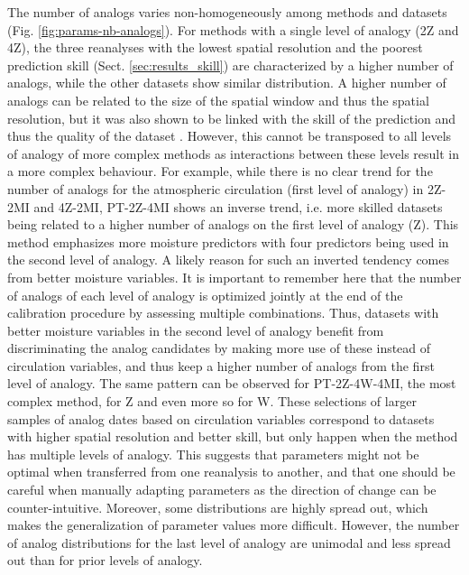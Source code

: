 \documentclass[alpha-refs]{wiley-article}
\begin{document}
The number of analogs varies non-homogeneously among methods and datasets (Fig. \ref{fig:params-nb-analogs}). For methods with a single level of analogy (2Z and 4Z), the three reanalyses with the lowest spatial resolution and the poorest prediction skill (Sect. \ref{sec:results_skill}) are characterized by a higher number of analogs, while the other datasets show similar distribution. A higher number of analogs can be related to the size of the spatial window and thus the spatial resolution, but it was also shown to be linked with the skill of the prediction and thus the quality of the dataset \citep{Horton2017b}. However, this cannot be transposed to all levels of analogy of more complex methods as interactions between these levels result in a more complex behaviour. For example, while there is no clear trend for the number of analogs for the atmospheric circulation (first level of analogy) in 2Z-2MI and 4Z-2MI, PT-2Z-4MI shows an inverse trend, i.e. more skilled datasets being related to a higher number of analogs on the first level of analogy (Z). This method emphasizes more moisture predictors with four predictors being used in the second level of analogy. A likely reason for such an inverted tendency comes from better moisture variables. It is important to remember here that the number of analogs of each level of analogy is optimized jointly at the end of the calibration procedure by assessing multiple combinations. Thus, datasets with better moisture variables in the second level of analogy benefit from discriminating the analog candidates by making more use of these instead of circulation variables, and thus keep a higher number of analogs from the first level of analogy. The same pattern can be observed for PT-2Z-4W-4MI, the most complex method, for Z and even more so for W. These selections of larger samples of analog dates based on circulation variables correspond to datasets with higher spatial resolution and better skill, but only happen when the method has multiple levels of analogy. This suggests that parameters might not be optimal when transferred from one reanalysis to another, and that one should be careful when manually adapting parameters as the direction of change can be counter-intuitive. Moreover, some distributions are highly spread out, which makes the generalization of parameter values more difficult. However, the number of analog distributions for the last level of analogy are unimodal and less spread out than for prior levels of analogy.
\end{document}
